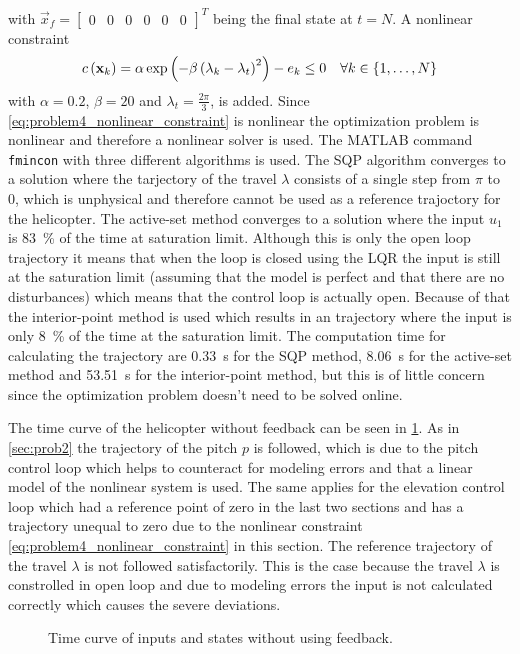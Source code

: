 with $\vec{x}_f=\begin{bmatrix} 0 & 0 & 0 & 0 & 0 & 0\end{bmatrix}^T$ being the final state at $t=N$. A nonlinear constraint 
\begin{equation}
c\left(\mathbf{x}_k\right)=\alpha \exp\left(-\beta\left(\lambda_k-\lambda_t\right)^2\right)-e_k\leq0 \quad \forall k\in\{1,\ldots,N\}
\label{eq:problem4_nonlinear_constraint}
\end{equation}
with $\alpha=0.2$, $\beta=20$ and $\lambda_t=\frac{2\pi}{3}$, is added. Since \eqref{eq:problem4_nonlinear_constraint} is nonlinear the optimization problem is nonlinear and therefore a nonlinear solver is used. The MATLAB command \verb|fmincon| with three different algorithms is used. The SQP algorithm converges to a solution where the tarjectory of the travel $\lambda$ consists of a single step from $\pi$ to 0, which is unphysical and therefore cannot be used as a reference trajoctory for the helicopter. The active-set method converges to a solution where the input $u_1$ is \SI{83}{\percent} of the time at saturation limit. Although this is only the open loop trajectory it means that when the loop is closed using the LQR the input is still at the saturation limit (assuming that the model is perfect and that there are no disturbances) which means that the control loop is actually open. Because of that the interior-point method is used which results in an trajectory where the input is only \SI{8}{\percent} of the time at the saturation limit. The computation time for calculating the trajectory are \SI{0.33}{\second} for the SQP method, \SI{8.06}{\second} for the active-set method and \SI{53.51}{\second} for the interior-point method, but this is of little concern since the optimization problem doesn't need to be solved online.

The time curve of the helicopter without feedback can be seen in \cref{fig:problem4plots_without_feedback}. As in \cref{sec:prob2} the trajectory of the pitch $p$ is followed, which is due to the pitch control loop which helps to counteract for modeling errors and that a linear model of the nonlinear system is used. The same applies for the elevation control loop which had a reference point of zero in the last two sections and has a trajectory unequal to zero due to the nonlinear constraint \eqref{eq:problem4_nonlinear_constraint} in this section. The reference trajectory of the travel $\lambda$ is not followed satisfactorily. This is the case because the travel $\lambda$ is constrolled in open loop and due to modeling errors the input is not calculated correctly which causes the severe deviations.
\begin{figure}[htbp]
	\centering
	\caption{Time curve of inputs and states without using feedback.}
	\label{fig:problem4plots_without_feedback}%
\end{figure}

